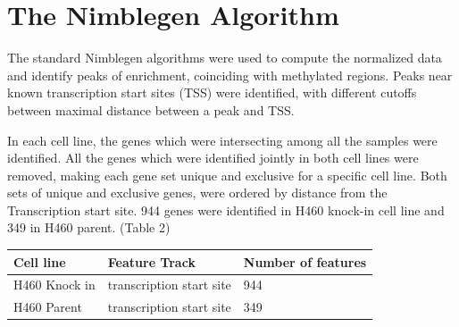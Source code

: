 \documentclass[11pt]{article}
\begin{document}
%
%
%
%
%


\section*{The Nimblegen Algorithm}

The standard Nimblegen algorithms were used to compute the normalized data and identify peaks of enrichment, coinciding with methylated regions. Peaks near known transcription start sites (TSS) were identified, with different cutoffs between maximal distance between a peak and TSS.



In each cell line, the genes which were intersecting among all the samples were identified. All the genes which were identified jointly in both cell lines were removed, making each gene set unique and exclusive for a specific cell line. Both sets of unique and exclusive genes, were ordered by distance from the Transcription start site. 944 genes were identified in H460 knock-in cell line and 349 in H460 parent. (Table 2)



\begin{table}[H]
\centering
	\begin{tabular}{|l|l|l|}
	\hline
		Cell line & Feature Track & Number of features \\ \hline
		H460 Knock in & transcription start site & 944 \\ \hline
		H460 Parent & transcription start site & 349 \\ \hline
	\end{tabular}
\end{table}
\end{document}
